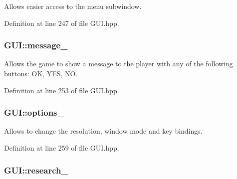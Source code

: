 Allows easier access to the menu subwindow. 



Definition at line 247 of file G\+U\+I.\+hpp.

\subsubsection[{\texorpdfstring{message\+\_\+}{message_}}]{ G\+U\+I\+::message\+\_\+\hspace{0.3cm}{\ttfamily [private]}}\hypertarget{class_g_u_i_a447ea4f3f0b635717a3a88317f534825}{}\label{class_g_u_i_a447ea4f3f0b635717a3a88317f534825}


Allows the game to show a message to the player with any of the following buttons\+: OK, Y\+ES, NO. 



Definition at line 253 of file G\+U\+I.\+hpp.

\subsubsection[{\texorpdfstring{options\+\_\+}{options_}}]{ G\+U\+I\+::options\+\_\+\hspace{0.3cm}{\ttfamily [private]}}\hypertarget{class_g_u_i_ac08ccbb1a55bae003d956ff299db3d91}{}\label{class_g_u_i_ac08ccbb1a55bae003d956ff299db3d91}


Allows to change the resolution, window mode and key bindings. 



Definition at line 259 of file G\+U\+I.\+hpp.

\subsubsection[{\texorpdfstring{research\+\_\+}{research_}}]{ G\+U\+I\+::research\+\_\+\hspace{0.3cm}{\ttfamily [private]}}\hypertarget{class_g_u_i_a37611f1e119a7c0b0d8d9682ac8a9432}{}\label{class_g_u_i_a37611f1e119a7c0b0d8d9682ac8a9432}


